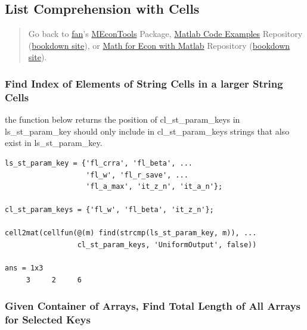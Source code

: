 \documentclass[
]{book}
\begin{document}
\hypertarget{list-comprehension-with-cells}{%
\subsection{List Comprehension with Cells}\label{list-comprehension-with-cells}}

\begin{quote}
Go back to \href{http://fanwangecon.github.io/}{fan}'s \href{https://fanwangecon.github.io/MEconTools/}{MEconTools} Package, \href{https://fanwangecon.github.io/M4Econ/}{Matlab Code Examples} Repository (\href{https://fanwangecon.github.io/M4Econ/bookdown}{bookdown site}), or \href{https://fanwangecon.github.io/Math4Econ/}{Math for Econ with Matlab} Repository (\href{https://fanwangecon.github.io/Math4Econ/bookdown}{bookdown site}).
\end{quote}

\hypertarget{find-index-of-elements-of-string-cells-in-a-larger-string-cells}{%
\subsubsection{Find Index of Elements of String Cells in a larger String Cells}\label{find-index-of-elements-of-string-cells-in-a-larger-string-cells}}

the function below returns the position of cl\_st\_param\_keys in
ls\_st\_param\_key should only include in cl\_st\_param\_keys strings that
also exist in ls\_st\_param\_key.

\begin{verbatim}
ls_st_param_key = {'fl_crra', 'fl_beta', ...
                   'fl_w', 'fl_r_save', ...
                   'fl_a_max', 'it_z_n', 'it_a_n'};

cl_st_param_keys = {'fl_w', 'fl_beta', 'it_z_n'};

cell2mat(cellfun(@(m) find(strcmp(ls_st_param_key, m)), ...
                 cl_st_param_keys, 'UniformOutput', false))

ans = 1x3    
     3     2     6
\end{verbatim}

\hypertarget{given-container-of-arrays-find-total-length-of-all-arrays-for-selected-keys}{%
\subsubsection{Given Container of Arrays, Find Total Length of All Arrays for Selected Keys}\label{given-container-of-arrays-find-total-length-of-all-arrays-for-selected-keys}}
\end{document}
